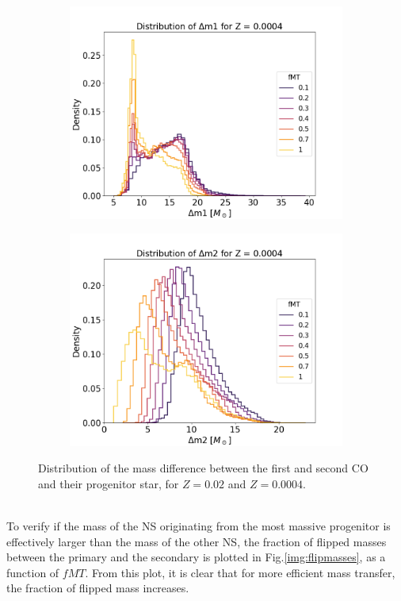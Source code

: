 \documentclass[preprint,12pt]{elsarticle}
\begin{document}
\begin{figure}[ht]
\begin{subfigure}[t]{0.45\textwidth}
        \includegraphics[width=1\textwidth]{Images/diff1Z0.0004.png}
    \end{subfigure}
    \begin{subfigure}[t]{0.45\textwidth}
        \centering  
        \includegraphics[width=1\textwidth]{Images/diff2Z0.0004.png}
    \end{subfigure}
    \caption{Distribution of the mass difference between the first and second CO and their progenitor star, for $Z=0.02$ and $Z=0.0004$.}
    \label{img:diff1}
 \end{figure}
 \\
To verify if the mass of the NS originating from the most massive progenitor is effectively larger than the mass of the other NS, the fraction of flipped masses between the primary and the secondary is plotted in Fig.\ref{img:flipmasses}, as a  function of $fMT$. From this plot, it is clear that for more efficient mass transfer, the fraction of flipped mass increases.
\end{document}
